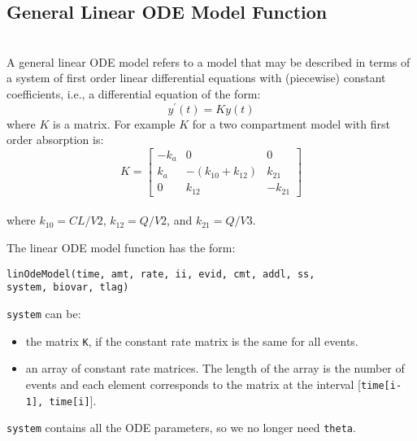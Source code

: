 \documentclass[11pt]{amsart}
\begin{document}
\subsection{General Linear ODE Model Function} \ \\

A general linear ODE model refers to a model that may be described in terms of a system of first order linear differential equations with (piecewise) constant coefficients, i.e., a differential equation of the form:
$$ y^\prime\left(t\right) = Ky\left(t\right) $$
where $K$ is a matrix. For example $K$ for a two compartment model with first order absorption is:
$$   K = \left[\begin{array}{ccc}
	-k_a & 0 & 0 \\
	k_a & -\left(k_{10} + k_{12}\right) & k_{21} \\
	0 & k_{12} & -k_{21}
	\end{array}\right] $$ \\
where $k_{10} = CL / V2 $, $ k_{12} = Q / V2 $, and $k_{21} = Q / V3 $.

The linear ODE model function has the form:

\texttt{linOdeModel(time, amt, rate, ii, evid, cmt, addl, ss,\\
\phantom{linOdeModel} system, biovar, tlag)}

\texttt{system} can be:
\begin{itemize}
  \item the matrix \texttt{K}, if the constant rate matrix is the same for all events.
  \item an array of constant rate matrices. The length of the array is the number of events and each element corresponds to the matrix at the interval [\texttt{time[i-1], time[i]}].
\end{itemize}
\texttt{system} contains all the ODE parameters, so we no longer need \texttt{theta}.
\end{document}
